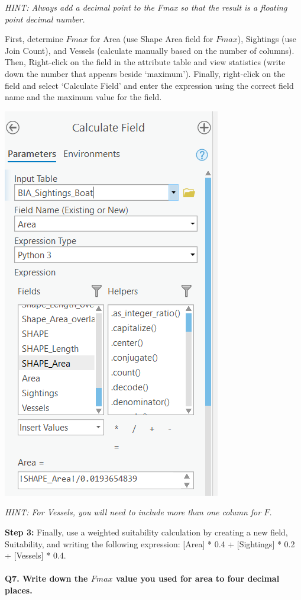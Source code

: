 \documentclass[
]{book}
\begin{document}
\emph{HINT: Always add a decimal point to the Fmax so that the result is a floating point decimal number.}

First, determine \(Fmax\) for Area (use Shape Area field for \(Fmax\)), Sightings (use Join Count), and Vessels (calculate manually based on the number of columns). Then, Right-click on the field in the attribute table and view statistics (write down the number that appears beside `maximum'). Finally, right-click on the field and select `Calculate Field' and enter the expression using the correct field name and the maximum value for the field.

\includegraphics[width=0.5\linewidth]{images/05-calculate-field}

\emph{HINT: For Vessels, you will need to include more than one column for \(F\).}

\textbf{Step 3:} Finally, use a weighted suitability calculation by creating a new field, Suitability, and writing the following expression:
{[}Area{]} * 0.4 + {[}Sightings{]} * 0.2 + {[}Vessels{]} * 0.4.

\hypertarget{q7.-write-down-the-fmax-value-you-used-for-area-to-four-decimal-places.}{%
\paragraph*{\texorpdfstring{Q7. Write down the \(Fmax\) value you used for area to four decimal places.}{Q7. Write down the Fmax value you used for area to four decimal places.}}\label{q7.-write-down-the-fmax-value-you-used-for-area-to-four-decimal-places.}}
\end{document}
